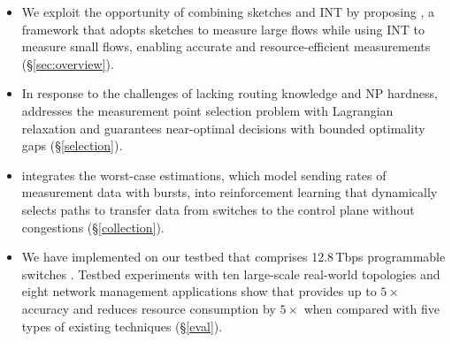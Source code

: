 \begin{itemize}[leftmargin=*]
%
%
    \item We exploit the opportunity of combining sketches and INT by proposing \sysname, a framework that adopts sketches to measure large flows while using INT to measure small flows, enabling accurate and resource-efficient measurements (\S\ref{sec:overview}). 
%
%
%
    \item In response to the challenges of lacking routing knowledge and NP hardness, \sysname addresses the measurement point selection problem with Lagrangian relaxation and guarantees near-optimal decisions with bounded optimality gaps (\S\ref{selection}). 
%
    \item \sysname integrates the worst-case estimations, which model sending rates of measurement data with bursts, into reinforcement learning that dynamically selects paths to transfer data from switches to the control plane without congestions (\S\ref{collection}).
%
    \item We have implemented \sysname on our testbed that comprises 12.8\,Tbps programmable switches \cite{tofino2}. Testbed experiments with ten large-scale real-world topologies and eight network management applications show that \sysname provides up to $5\times$ accuracy and reduces resource consumption by $5\times$ when compared with five types of existing techniques (\S\ref{eval}).
%
\end{itemize}


